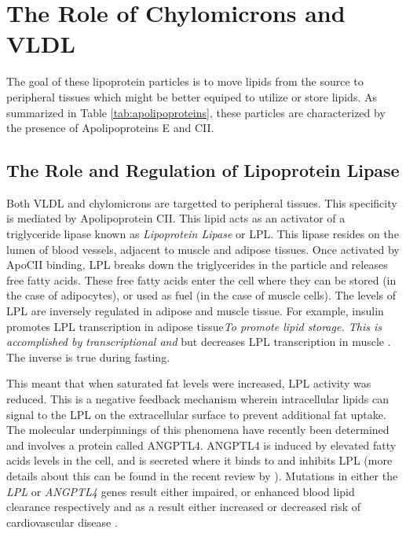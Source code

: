 \documentclass{tufte-handout}
\begin{document}
\section{The Role of Chylomicrons and VLDL}

The goal of these lipoprotein particles is to move lipids from the source to peripheral tissues which might be better equiped to utilize or store lipids.  As summarized in Table \ref{tab:apolipoproteins}, these particles are characterized by the presence of Apolipoproteins E and CII.

\subsection{The Role and Regulation of Lipoprotein Lipase}

Both VLDL and chylomicrons are targetted to peripheral tissues.  This specificity is mediated by Apolipoprotein CII.  This lipid acts as an activator of a triglyceride lipase known as \emph{Lipoprotein Lipase} or LPL.  This lipase resides on the lumen of blood vessels, adjacent to muscle and adipose tissues.  Once activated by ApoCII binding, LPL breaks down the triglycerides in the particle and releases free fatty acids.  These free fatty acids enter the cell where they can be stored (in the case of adipocytes), or used as fuel (in the case of muscle cells).  The levels of LPL are inversely regulated in adipose and muscle tissue.  For example, insulin promotes LPL transcription in adipose tissue\emph{To promote lipid storage.  This is accomplished by transcriptional and } but decreases LPL transcription in muscle \citep{Spooners1979}.  The inverse is true during fasting.

  This meant that when saturated fat levels were increased, LPL activity was reduced.  This is a negative feedback mechanism wherein intracellular lipids can signal to the LPL on the extracellular surface to prevent additional fat uptake.  The molecular underpinnings of this phenomena have recently been determined and involves a protein called ANGPTL4.  ANGPTL4 is induced by elevated fatty acids levels in the cell, and is secreted where it binds to and inhibits LPL (more details about this can be found in the recent review by \citet{Dijk2014}).  Mutations in either the \textit{LPL} or \textit{ANGPTL4} genes result either impaired, or enhanced blood lipid clearance respectively and as a result either increased or decreased risk of cardiovascular disease \citep{Article2016b}.
\end{document}
